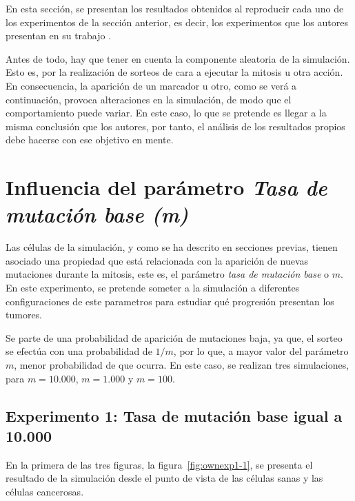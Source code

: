 En esta sección, se presentan los resultados obtenidos al reproducir cada uno de
los experimentos de la sección anterior, es decir, los experimentos que los autores
presentan en su trabajo \cite{jsantos-amonteagudo-1-2014}.

Antes de todo, hay que tener en cuenta la componente aleatoria de la simulación. Esto es, por
la realización de sorteos de cara a ejecutar la mitosis u otra acción. En consecuencia, la aparición
de un marcador u otro, como se verá a continuación, provoca alteraciones en la simulación, de modo que
el comportamiento puede variar. En este caso, lo que se pretende es llegar a la misma conclusión que los autores,
por tanto, el análisis de los resultados propios debe hacerse con ese objetivo en mente.

\section{Influencia del parámetro \textit{Tasa de mutación base (m)}}

Las células de la simulación, y como se ha descrito en secciones previas, tienen asociado una propiedad que está relacionada con la aparición
de nuevas mutaciones durante la mitosis, este es, el parámetro \textit{tasa de mutación base} o $m$. En este experimento,
se pretende someter a la simulación a diferentes configuraciones de este parametros para estudiar qué
progresión presentan los tumores.

Se parte de una probabilidad de aparición de mutaciones baja, ya que, el sorteo se efectúa con una probabilidad de
$1/m$, por lo que, a mayor valor del parámetro $m$, menor probabilidad de que ocurra. En este caso, se
realizan tres simulaciones, para $m=10.000$, $m=1.000$ y $m=100$.

\subsection{Experimento 1: Tasa de mutación base igual a 10.000}

En la primera de las tres figuras, la figura~\ref{fig:ownexp1-1}, se presenta el resultado
de la simulación desde el punto de vista de las células sanas y las células cancerosas.

